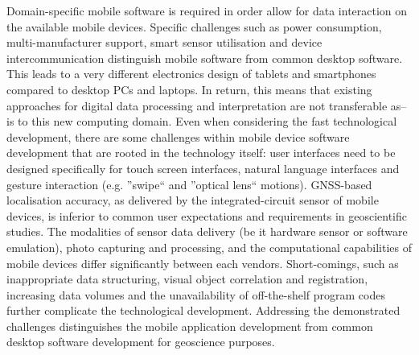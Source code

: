 \documentclass[review]{elsarticle}
\begin{document}

Domain-specific mobile software is required in order allow for data interaction on the available mobile devices. Specific challenges such as power consumption, multi-manufacturer support, smart sensor utilisation and device intercommunication distinguish mobile software from common desktop software. This leads to a very different electronics design of tablets and smartphones compared to desktop PCs and laptops. In return, this means that existing approaches for digital data processing and interpretation are not transferable as--is to this new computing domain. Even when considering the fast technological development, there are some challenges within mobile device software development that are rooted in the technology itself: user interfaces need to be designed specifically for touch screen interfaces, natural language interfaces and gesture interaction (e.g. ''swipe`` and ''optical lens`` motions). \Gls{GNSS}-based localisation accuracy, as delivered by the integrated-circuit sensor of mobile devices, is inferior to common user expectations and requirements in geoscientific studies. The modalities of sensor data delivery (be it hardware sensor or software emulation), photo capturing and processing, and the computational capabilities of mobile devices differ significantly between each vendors. Short-comings, such as inappropriate data structuring, visual object correlation and registration, increasing data volumes and the unavailability of off-the-shelf program codes further complicate the technological development. Addressing the demonstrated challenges distinguishes the mobile application development from common desktop software development for geoscience purposes.
\end{document}
